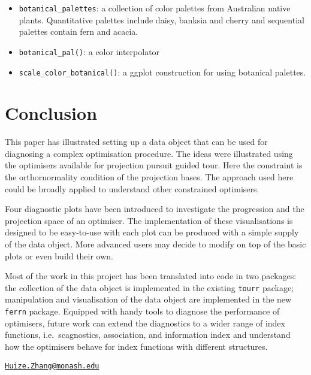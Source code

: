 \begin{itemize}
  \begin{itemize}
  \tightlist
  \item
    \texttt{botanical\_palettes}: a collection of color palettes from Australian native plants. Quantitative palettes include daisy, banksia and cherry and sequential palettes contain fern and acacia.
  \item
    \texttt{botanical\_pal()}: a color interpolator
  \item
    \texttt{scale\_color\_botanical()}: a ggplot construction for using botanical palettes.
  \end{itemize}
\end{itemize}

\hypertarget{conclusion}{%
\section{Conclusion}\label{conclusion}}

This paper has illustrated setting up a data object that can be used for diagnosing a complex optimisation procedure. The ideas were illustrated using the optimisers available for projection pursuit guided tour. Here the constraint is the orthornormality condition of the projection bases. The approach used here could be broadly applied to understand other constrained optimisers.

Four diagnostic plots have been introduced to investigate the progression and the projection space of an optimiser. The implementation of these visualisations is designed to be easy-to-use with each plot can be produced with a simple supply of the data object. More advanced users may decide to modify on top of the basic plots or even build their own.

Most of the work in this project has been translated into code in two packages: the collection of the data object is implemented in the existing \texttt{tourr} package; manipulation and visualisation of the data object are implemented in the new \texttt{ferrn} package. Equipped with handy tools to diagnose the performance of optimisers, future work can extend the diagnostics to a wider range of index functions, i.e.~scagnostics, association, and information index \citep{laa2020using} and understand how the optimisers behave for index functions with different structures.

\clearpage




\address{%
H.Sherry Zhang\\
Department of Econometrics and Business Statistics, Monash University\\
\\
}
\href{mailto:Huize.Zhang@monash.edu}{\nolinkurl{Huize.Zhang@monash.edu}}

